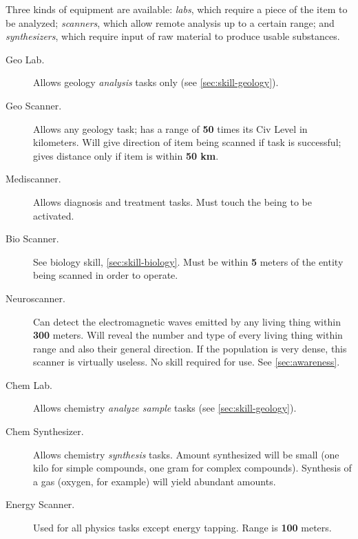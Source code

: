 Three kinds of equipment are available: \emph{labs}, which require a
piece of the item to be analyzed; \emph{scanners}, which allow remote
analysis up to a certain range; and \emph{synthesizers}, which require
input of raw material to produce usable substances.

\begin{description}
\item[Geo Lab.] Allows geology \emph{analysis} tasks only (see
  \ref{sec:skill-geology}). 
\item[\hypertarget{tag:geoscanner}{Geo Scanner}.] Allows any geology task; has a range of
  \textbf{50} times its Civ Level in kilometers. Will give direction
  of item being scanned if task is successful; gives distance only if
  item is within \textbf{50 km}.
\item[Mediscanner.] Allows diagnosis and treatment tasks. Must touch
  the being to be activated.
\item[\hypertarget{tag:bioscanner}{Bio Scanner}.] See biology skill, \ref{sec:skill-biology}.  Must
  be within \textbf{5} meters of the entity being scanned in order to
  operate.
\item[\hypertarget{tag:neuroscanner}{Neuroscanner}.] Can detect the electromagnetic waves emitted by
  any living thing within \textbf{300} meters. Will reveal the number
  and type of every living thing within range and also their general
  direction. If the population is very dense, this scanner is
  virtually useless. No skill required for use.  See \ref{sec:awareness}.
\item[\hypertarget{tag:chemlab}{Chem Lab}.] Allows chemistry \emph{analyze sample} tasks (see
  \ref{sec:skill-geology}).
\item[\hypertarget{tag:chemsynth}{Chem Synthesizer}.] Allows chemistry \emph{synthesis} tasks.
  Amount synthesized will be small (one kilo for simple compounds, one
  gram for complex compounds). Synthesis of a gas (oxygen, for
  example) will yield abundant amounts.
\item[Energy Scanner.] Used for all physics tasks except energy
  tapping. Range is \textbf{100} meters.
\end{description}


